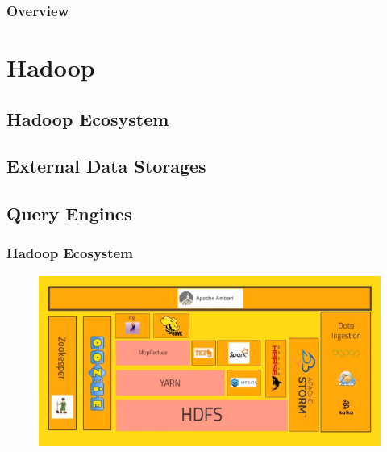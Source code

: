 \documentclass{beamer}
\begin{document}

\begin{frame}
\frametitle{Overview} %
\tableofcontents %
\end{frame}





\section{Hadoop}
\subsection{Hadoop Ecosystem}
\subsection{External Data Storages}
\subsection{Query Engines}


\begin{frame}
\frametitle{Hadoop Ecosystem}
\begin{figure}
	\includegraphics[scale=0.8]{hadoop}
\end{figure}

\end{frame}
\end{document}
